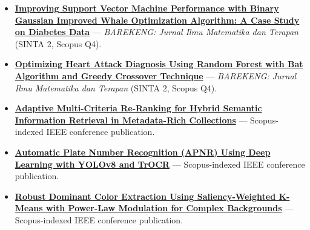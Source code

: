 \begin{itemize}
  \item \href{https://ojs3.unpatti.ac.id/index.php/barekeng/article/view/17391}{\textbf{Improving Support Vector Machine Performance with Binary Gaussian Improved Whale Optimization Algorithm: A Case Study on Diabetes Data}} --- \textit{BAREKENG: Jurnal Ilmu Matematika dan Terapan} (SINTA 2, Scopus Q4).
  \item \href{https://ojs3.unpatti.ac.id/index.php/barekeng/article/view/11531}{\textbf{Optimizing Heart Attack Diagnosis Using Random Forest with Bat Algorithm and Greedy Crossover Technique}} --- \textit{BAREKENG: Jurnal Ilmu Matematika dan Terapan} (SINTA 2, Scopus Q4).
  \item \href{https://ieeexplore.ieee.org/abstract/document/11470214}{\textbf{Adaptive Multi-Criteria Re-Ranking for Hybrid Semantic Information Retrieval in Metadata-Rich Collections}} --- Scopus-indexed IEEE conference publication.
  \item \href{https://ieeexplore.ieee.org/abstract/document/11470508}{\textbf{Automatic Plate Number Recognition (APNR) Using Deep Learning with YOLOv8 and TrOCR}} --- Scopus-indexed IEEE conference publication.
  \item \href{https://ieeexplore.ieee.org/document/11519632/}{\textbf{Robust Dominant Color Extraction Using Saliency-Weighted K-Means with Power-Law Modulation for Complex Backgrounds}} --- Scopus-indexed IEEE conference publication.
\end{itemize}
